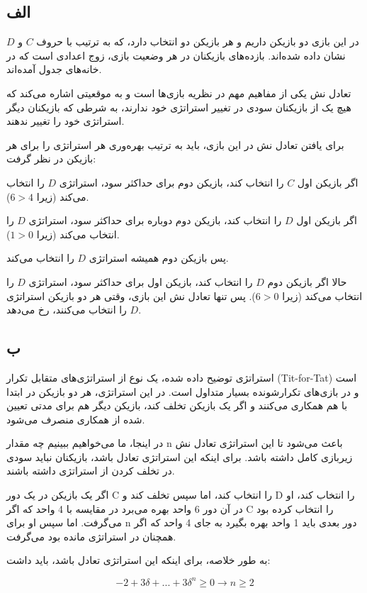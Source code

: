 \subsection*{الف}

در این بازی دو بازیکن داریم و هر بازیکن دو انتخاب دارد، که به ترتیب با حروف $C$ و $D$ نشان داده شده‌اند. بازده‌های بازیکنان در هر وضعیت بازی، زوج اعدادی است که در خانه‌های جدول آمده‌اند.

تعادل نش یکی از مفاهیم مهم در نظریه بازی‌ها است و به موقعیتی اشاره می‌کند که هیچ یک از بازیکنان سودی در تغییر استراتژی خود ندارند، به شرطی که بازیکنان دیگر استراتژی خود را تغییر ندهند.

برای یافتن تعادل نش در این بازی، باید به ترتیب بهره‌وری هر استراتژی را برای هر بازیکن در نظر گرفت:

اگر بازیکن اول $C$ را انتخاب کند، بازیکن دوم برای حداکثر سود، استراتژی $D$ را انتخاب می‌کند (زیرا $6 > 4$).

اگر بازیکن اول $D$ را انتخاب کند، بازیکن دوم دوباره برای حداکثر سود، استراتژی $D$ را انتخاب می‌کند (زیرا $1 > 0$).

پس بازیکن دوم همیشه استراتژی $D$ را انتخاب می‌کند.

حالا اگر بازیکن دوم $D$ را انتخاب کند، بازیکن اول برای حداکثر سود، استراتژی $D$ را انتخاب می‌کند (زیرا $6 > 0$).
پس تنها تعادل نش این بازی، وقتی هر دو بازیکن استراتژی $D$ را انتخاب می‌کنند، رخ می‌دهد.

\subsection*{ب}

استراتژی توضیح داده شده، یک نوع از استراتژی‌های متقابل تکرار (Tit-for-Tat) است و در بازی‌های تکرارشونده بسیار متداول است. در این استراتژی، هر دو بازیکن در ابتدا با هم همکاری می‌کنند و اگر یک بازیکن تخلف کند، بازیکن دیگر هم برای مدتی تعیین شده از همکاری منصرف می‌شود.

در اینجا، ما می‌خواهیم ببینیم چه مقدار n باعث می‌شود تا این استراتژی تعادل نش زیربازی کامل داشته باشد. برای اینکه این استراتژی تعادل باشد، بازیکنان نباید سودی در تخلف کردن از استراتژی داشته باشند.

اگر یک بازیکن در یک دور C را انتخاب کند، اما سپس تخلف کند و D را انتخاب کند، او در آن دور 6 واحد بهره می‌برد در مقایسه با 4 واحد که اگر C را انتخاب کرده بود می‌گرفت. اما سپس او برای n دور بعدی باید 1 واحد بهره بگیرد به جای 4 واحد که اگر همچنان در استراتژی مانده بود می‌گرفت.

به طور خلاصه، برای اینکه این استراتژی تعادل باشد، باید داشت:

$$
-2 + 3 \delta + ... + 3 \delta^n \geq 0 \rightarrow n \geq 2
$$
